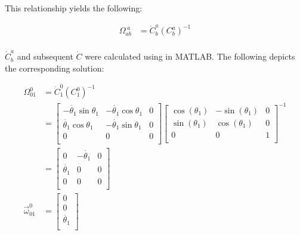 \begin{parts}
\begin{subparts}
        This relationship yields the following:

        \begin{equation}
            \begin{split}
                \Omega_{ab}^{\;a}  & = \dot{C}^a_b(C^a_b)^{-1} \\
            \end{split}
            \label{eq:skew}
        \end{equation}


        \solution
        $\dot{C}^a_b$ and subsequent $\dot{C}$ were calculated using  in MATLAB\@. The following depicts the corresponding solution:

        \begin{equation*}
            \begin{split}
                {\Omega}^0_{01} & = \dot{C}^0_1(C^0_1)^{-1}\\
                & =
                \begin{bmatrix}
                    -\dot{\theta_1}\sin{\theta_1} & -\dot{\theta_1}\cos{\theta_1} & 0 \\
                    \dot{\theta_1}\cos{\theta_1}  & -\dot{\theta_1}\sin{\theta_1} & 0 \\
                    0                             & 0                             & 0 \\
                \end{bmatrix}
                \begin{bmatrix}
                    \cos(\theta_1) & -\sin(\theta_1) & 0 \\
                    \sin(\theta_1) & \cos(\theta_1)  & 0 \\
                    0              & 0               & 1 \\
                \end{bmatrix}^{-1} \\
                & =
                \begin{bmatrix}
                    0              & -\dot{\theta_1} & 0 \\
                    \dot{\theta_1} & 0               & 0 \\
                    0              & 0               & 0 \\
                \end{bmatrix} \\
                \vec{\omega}^0_{01} & =
                \begin{bmatrix}
                    0              \\
                    0              \\
                    \dot{\theta_1} \\
                \end{bmatrix}
            \end{split}
        \end{equation*}



\end{subparts}
\end{parts}
